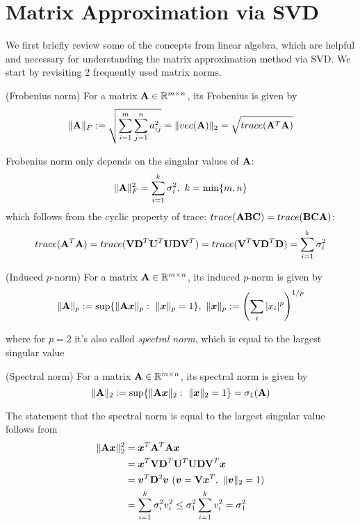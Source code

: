 \documentclass[../book-template.tex]{subfiles}
\begin{document}
\section{Matrix Approximation via SVD}
We first briefly review some of the concepts from linear algebra, which are helpful and necessary for understanding the matrix approximation method via SVD. We start by revisiting 2 frequently used matrix norms.
\begin{definition}
	(Frobenius norm) For a matrix ${\bf A}\in \mathbb{R}^{m \times n}$, its Frobenius is given by
	\begin{equation*}
		\|{\bf A}\|_F :=\sqrt{\sum_{i=1}^{m}\sum_{j=1}^{n}a_{ij}^2}=\|vec({\bf A})\|_2=\sqrt{trace({\bf A}^T{\bf A})}
	\end{equation*}
\end{definition}
Frobenius norm only depends on the singular values of ${\bf A}$:
\begin{equation*}
	\|{\bf A}\|_F^2 = \sum_{i=1}^{k}\sigma_i^2,\ k=\min\{m,n\}
\end{equation*}
which follows from the cyclic property of trace: $trace({\bf ABC})=trace({\bf BCA})$:
\begin{equation*}
	trace({\bf A}^T{\bf A}) = trace({\bf VD}^T{\bf U}^T{\bf UDV}^T)=trace({\bf V}^T{\bf VD}^T{\bf D}) = \sum_{i=1}^{k}\sigma_i^2
\end{equation*}
\begin{definition}
	(Induced $p$-norm) For a matrix ${\bf A}\in \mathbb{R}^{m \times n}$, its induced $p$-norm is given by
	\begin{equation*}
	\|{\bf A}\|_p :=\sup\{\|{\bf A}\bm{x}\|_p:\ \|\bm{x}\|_p=1\},\ \|\bm{x}\|_p:=\left(\sum_{i}|x_i|^p\right)^{1/p}
	\end{equation*}
\end{definition}
where for $p=2$ it's also called \emph{spectral norm}, which is equal to the largest singular value
\begin{definition}
	(Spectral norm) For a matrix ${\bf A}\in \mathbb{R}^{m \times n}$, its spectral norm is given by
	\begin{equation*}
	\|{\bf A}\|_2 :=\sup\{\|{\bf A}\bm{x}\|_2:\ \|\bm{x}\|_2=1\}=\sigma_1({\bf A})
	\end{equation*}
\end{definition}
The statement that the spectral norm is equal to the largest singular value follows from
\begin{align*}
	\|{\bf A}\bm{x}\|_2^2 
	&= \bm{x}^T{\bf A}^T{\bf A}\bm{x}\\
	&=  \bm{x}^T{\bf VD}^T{\bf U}^T{\bf UDV}^T\bm{x}\\
	&= \bm{v}^T{\bf D}^2\bm{v}\ (\bm{v} = {\bf V}\bm{x}^T,\ \|\bm{v}\|_2=1)\\
	&= \sum_{i=1}^{k} \sigma_i^2v_i^2\leq \sigma_1^2\sum_{i=1}^{k}v_i^2 = \sigma_1^2
\end{align*}
\end{document}
